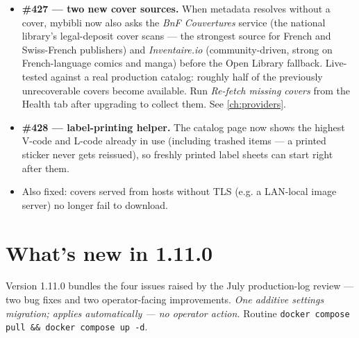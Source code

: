 \begin{itemize}
  \item \textbf{\#427 \string— two new cover sources.} When metadata
        resolves without a cover, mybibli now also asks the
        \emph{BnF Couvertures} service (the national library's
        legal-deposit cover scans — the strongest source for French
        and Swiss-French publishers) and \emph{Inventaire.io}
        (community-driven, strong on French-language comics and
        manga) before the Open Library fallback. Live-tested against
        a real production catalog: roughly half of the previously
        unrecoverable covers become available. Run \emph{Re-fetch
        missing covers} from the Health tab after upgrading to
        collect them. See \autoref{ch:providers}.
  \item \textbf{\#428 \string— label-printing helper.} The catalog
        page now shows the highest V-code and L-code already in use
        (including trashed items — a printed sticker never gets
        reissued), so freshly printed label sheets can start right
        after them.
  \item Also fixed: covers served from hosts without TLS (e.g. a
        LAN-local image server) no longer fail to download.
\end{itemize}

\section{What's new in 1.11.0}\label{sec:whats-new-1.11.0}

Version 1.11.0 bundles the four issues raised by the July production-log
review — two bug fixes and two operator-facing improvements. \emph{One
additive settings migration; applies automatically — no operator
action.} Routine \texttt{docker compose pull \&\& docker compose up -d}.

